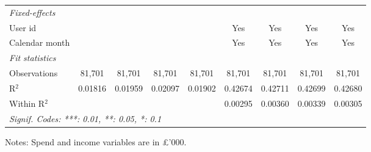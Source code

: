 \begin{table}[htbp]
\begin{threeparttable}[b]
\begin{tabular}{lcccccccc}
         \emph{Fixed-effects}\\
         User id                  &                                &                  &                  &                  & Yes             & Yes             & Yes             & Yes\\  
         Calendar month           &                                &                  &                  &                  & Yes             & Yes             & Yes             & Yes\\  
         \midrule
         \emph{Fit statistics}\\
         Observations             & 81,701                         & 81,701           & 81,701           & 81,701           & 81,701          & 81,701          & 81,701          & 81,701\\  
         R$^2$                    & 0.01816                        & 0.01959          & 0.02097          & 0.01902          & 0.42674         & 0.42711         & 0.42699         & 0.42680\\  
         Within R$^2$             &                                &                  &                  &                  & 0.00295         & 0.00360         & 0.00339         & 0.00305\\  
         \midrule \midrule
         \multicolumn{9}{l}{\emph{Signif. Codes: ***: 0.01, **: 0.05, *: 0.1}}\\
      \end{tabular}
      
      \begin{tablenotes}\footnotesize
         \item Notes: Spend and income variables are in \pounds'000.
      \end{tablenotes}
   \end{threeparttable}
\end{table}



